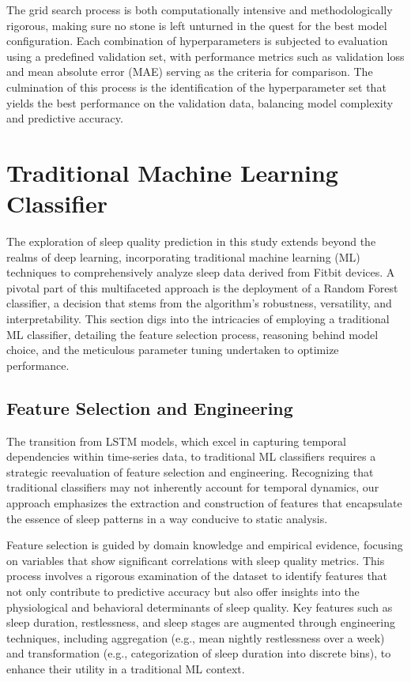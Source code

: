 \documentclass[10pt]{extarticle}
\begin{document}
The grid search process is both computationally intensive and methodologically rigorous, making sure no stone is left unturned in the quest for the best model configuration. Each combination of hyperparameters is subjected to evaluation using a predefined validation set, with performance metrics such as validation loss and mean absolute error (MAE) serving as the criteria for comparison. The culmination of this process is the identification of the hyperparameter set that yields the best performance on the validation data, balancing model complexity and predictive accuracy.

\section{Traditional Machine Learning Classifier}

The exploration of sleep quality prediction in this study extends beyond the realms of deep learning, incorporating traditional machine learning (ML) techniques to comprehensively analyze sleep data derived from Fitbit devices. A pivotal part of this multifaceted approach is the deployment of a Random Forest classifier, a decision that stems from the algorithm's robustness, versatility, and interpretability. This section digs into the intricacies of employing a traditional ML classifier, detailing the feature selection process, reasoning behind model choice, and the meticulous parameter tuning undertaken to optimize performance.

\subsection{Feature Selection and Engineering}

The transition from LSTM models, which excel in capturing temporal dependencies within time-series data, to traditional ML classifiers requires a strategic reevaluation of feature selection and engineering. Recognizing that traditional classifiers may not inherently account for temporal dynamics, our approach emphasizes the extraction and construction of features that encapsulate the essence of sleep patterns in a way conducive to static analysis.

Feature selection is guided by domain knowledge and empirical evidence, focusing on variables that show significant correlations with sleep quality metrics. This process involves a rigorous examination of the dataset to identify features that not only contribute to predictive accuracy but also offer insights into the physiological and behavioral determinants of sleep quality. Key features such as sleep duration, restlessness, and sleep stages are augmented through engineering techniques, including aggregation (e.g., mean nightly restlessness over a week) and transformation (e.g., categorization of sleep duration into discrete bins), to enhance their utility in a traditional ML context.
\end{document}
